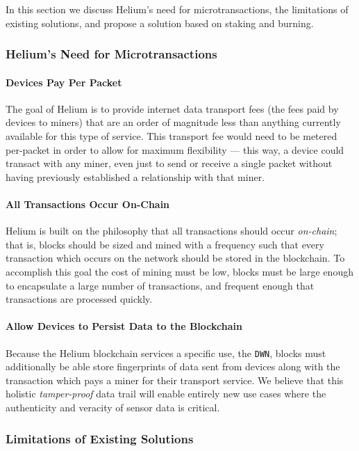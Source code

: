 \documentclass[letterpaper,11pt]{article}
\begin{document}
In this section we discuss Helium's need for microtransactions, the limitations of existing solutions, and propose a solution based on staking and burning.

\subsubsection{Helium's Need for Microtransactions}

\paragraph{Devices Pay Per Packet}
The goal of Helium is to provide internet data transport fees (the fees paid by devices to miners) that are an order of magnitude less than anything currently available for this type of service. This transport fee would need to be metered per-packet in order to allow for maximum flexibility --- this way, a device could transact with any miner, even just to send or receive a single packet without having previously established a relationship with that miner.

\paragraph{All Transactions Occur On-Chain}
Helium is built on the philosophy that all transactions should occur \emph{on-chain}; that is, blocks should be sized and mined with a frequency such that every transaction which occurs on the network should be stored in the blockchain.  To accomplish this goal the cost of mining must be low, blocks must be large enough to encapsulate a large number of transactions, and frequent enough that transactions are processed quickly.

\paragraph{Allow Devices to Persist Data to the Blockchain}
Because the Helium blockchain services a specific use, the \verb|DWN|, blocks must additionally be able store fingerprints of data sent from devices along with the transaction which pays a miner for their transport service.  We believe that this holistic \emph{tamper-proof} data trail will enable entirely new use cases where the authenticity and veracity of sensor data is critical.

\subsubsection{Limitations of Existing Solutions}
\end{document}
